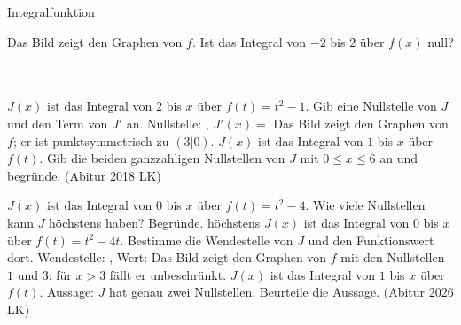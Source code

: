 \setcounter{aufgabe}{14}

\begin{aufgabe}{Integralfunktion}
\begin{teile}
\teil Das Bild zeigt den Graphen von $f$. Ist das Integral von $-2$ bis $2$ über $f(x)$ null? \\  \\  \\ 

\begin{ksys}[xmin=-3,xmax=3,ymin=-3,ymax=3,ablesen]  \end{ksys}
\teil $J(x)$ ist das Integral von $2$ bis $x$ über $f(t) = t^2 - 1$. Gib eine Nullstelle von $J$ und den Term von $J'$ an. Nullstelle: \leerfeld , $J'(x) = $ \leerfeld
\teil Das Bild zeigt den Graphen von $f$; er ist punktsymmetrisch zu $(3 | 0)$. $J(x)$ ist das Integral von $1$ bis $x$ über $f(t)$. Gib die beiden ganzzahligen Nullstellen von $J$ mit $0 \le x \le 6$ an und begründe. \hfill (Abitur 2018 LK)

\begin{ksys}[xmin=-1,xmax=7,ymin=-4,ymax=4,ablesen]  \end{ksys}
\teil $J(x)$ ist das Integral von $0$ bis $x$ über $f(t) = t^2 - 4$. Wie viele Nullstellen kann $J$ höchstens haben? Begründe. höchstens \leerfeld
\teil $J(x)$ ist das Integral von $0$ bis $x$ über $f(t) = t^2 - 4t$. Bestimme die Wendestelle von $J$ und den Funktionswert dort. Wendestelle: \leerfeld , Wert: \leerfeld
\teil Das Bild zeigt den Graphen von $f$ mit den Nullstellen $1$ und $3$; für $x > 3$ fällt er unbeschränkt. $J(x)$ ist das Integral von $1$ bis $x$ über $f(t)$. Aussage: $J$ hat genau zwei Nullstellen. Beurteile die Aussage. \hfill (Abitur 2026 LK) \\  \\ 

\begin{ksys}[xmin=-1,xmax=5,ymin=-6,ymax=4,ablesen]  \end{ksys}
\end{teile}
\end{aufgabe}

